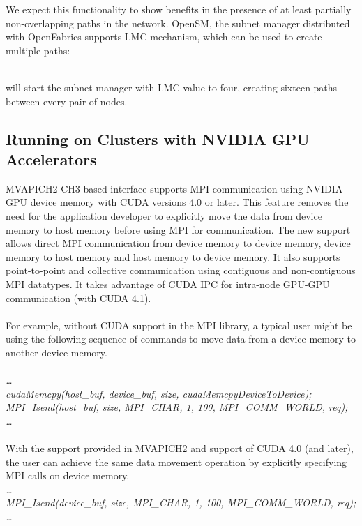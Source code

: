We expect this functionality to show benefits in the presence of
at least partially non-overlapping paths in the network. OpenSM, the subnet manager
distributed with OpenFabrics supports LMC mechanism, which can be used
to create multiple paths:

 \\

will start the subnet manager with LMC value to four, creating sixteen
paths between every pair of nodes.

\subsection{Running on Clusters with NVIDIA GPU Accelerators}
\label{def:mv2-gpu}

MVAPICH2 CH3-based interface supports MPI communication using NVIDIA GPU device memory
with CUDA versions 4.0 or later. This feature removes the need for the application developer
to explicitly move the data from device memory to host memory before using MPI for communication.
The new support allows direct MPI communication from device memory to device memory,
device memory to host memory and host memory to device memory. It also supports point-to-point and
collective communication using contiguous and non-contiguous MPI datatypes. It takes advantage of CUDA IPC
for intra-node GPU-GPU communication (with CUDA 4.1).\\
\\
For example, without CUDA support in the MPI library, a typical user might be using
the following sequence of commands to move data from a device memory
to another device memory.\\
\\
\textit{\ldots\\
cudaMemcpy(host\_buf, device\_buf, size, cudaMemcpyDeviceToDevice);\\
MPI\_Isend(host\_buf, size, MPI\_CHAR, 1, 100, MPI\_COMM\_WORLD, req);\\
\ldots\\}
\\
With the support provided in MVAPICH2 and support of CUDA 4.0 (and later),
the user can achieve the same data movement operation by explicitly specifying MPI calls on device memory. \\
\textit{\ldots\\
MPI\_Isend(device\_buf, size, MPI\_CHAR, 1, 100, MPI\_COMM\_WORLD, req);\\
\ldots\\}

